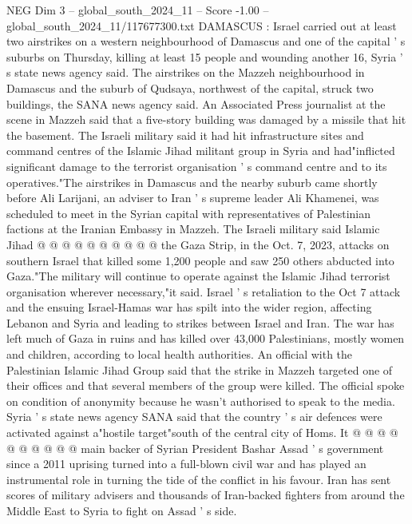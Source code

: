 \begin{textsample}{NEG Dim 3 – global\_south\_2024\_11 – Score -1.00 – global\_south\_2024\_11/117677300.txt}  \label{ex:f3_neg_152}
DAMASCUS : Israel carried out at least two airstrikes on a western neighbourhood of Damascus and one of the capital ' s suburbs on Thursday, killing at least 15 people and wounding another 16, Syria ' s state news agency said.
The airstrikes on the Mazzeh neighbourhood in Damascus and the suburb of Qudsaya, northwest of the capital, struck two buildings, the SANA news agency said.
An Associated Press journalist at the scene in Mazzeh said that a five-story building was damaged by a missile that hit the basement.
The Israeli military said it had hit infrastructure sites and command centres of the Islamic Jihad militant group in Syria and had"inflicted significant damage to the terrorist organisation ' s command centre and to its operatives."The airstrikes in Damascus and the nearby suburb came shortly before Ali Larijani, an adviser to Iran ' s supreme leader Ali Khamenei, was scheduled to meet in the Syrian capital with representatives of Palestinian factions at the Iranian Embassy in Mazzeh.
The Israeli military said Islamic Jihad @ @ @ @ @ @ @ @ @ @ the Gaza Strip, in the Oct. 7, 2023, attacks on southern Israel that killed some 1,200 people and saw 250 others abducted into Gaza."The military will continue to operate against the Islamic Jihad terrorist organisation wherever necessary,"it said.
Israel ' s retaliation to the Oct 7 attack and the ensuing Israel-Hamas war has spilt into the wider region, affecting Lebanon and Syria and leading to strikes between Israel and Iran.
The war has left much of Gaza in ruins and has killed over 43,000 Palestinians, mostly women and children, according to local health authorities.
An official with the Palestinian Islamic Jihad Group said that the strike in Mazzeh targeted one of their offices and that several members of the group were killed.
The official spoke on condition of anonymity because he wasn't authorised to speak to the media.
Syria ' s state news agency SANA said that the country ' s air defences were activated against a"hostile target"south of the central city of Homs.
It @ @ @ @ @ @ @ @ @ @ main backer of Syrian President Bashar Assad ' s government since a 2011 uprising turned into a full-blown civil war and has played an instrumental role in turning the tide of the conflict in his favour.
Iran has sent scores of military advisers and thousands of Iran-backed fighters from around the Middle East to Syria to fight on Assad ' s side.

\end{textsample}
